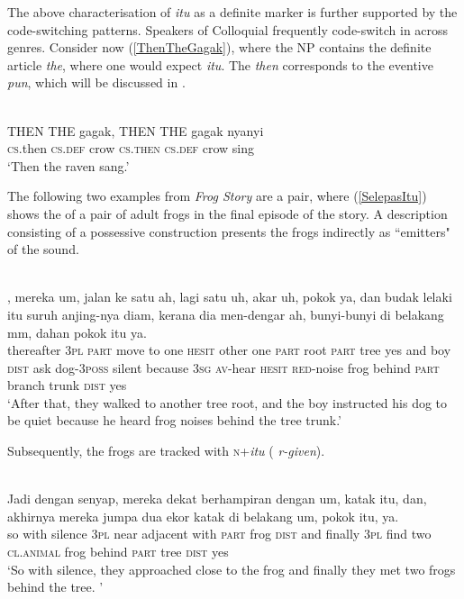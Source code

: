 \documentclass[output=paper
,modfonts
,nonflat]{langsci/langscibook}
\begin{document}
\noindent
The above characterisation of \emph{itu} as a definite marker is further supported by the code-switching patterns. Speakers of Colloquial   frequently code-switch in  across genres. Consider now (\ref{ThenTheGagak}), where the NP contains the  definite article \emph{the}, where one would expect \emph{itu}. The  \emph{then} corresponds to the eventive \emph{pun}, which will be discussed in .

\ea\label{ThenTheGagak} 
\\
\gll 	THEN THE    gagak, THEN THE    gagak nyanyi\\
\textsc{cs.}then \textsc{cs.def} crow  \textsc{cs.then} \textsc{cs.def} crow sing\\
\glt `Then the raven sang.'\\
\z

\noindent
The following two examples from \emph{Frog Story} are a pair, where (\ref{SelepasItu}) shows the  of a pair of adult frogs in the final episode of the story. A description consisting of a possessive construction presents the frogs indirectly as ``emitters" of the sound.

\ea\label{SelepasItu} 
\\
, mereka um,       jalan ke   satu ah,   lagi  satu uh,  akar uh,   pokok ya, dan {budak lelaki} itu suruh anjing-nya     diam,  kerana  dia men-dengar ah,    {\ob}bunyi-bunyi     {di belakang} mm,       dahan  pokok itu ya.\\
thereafter   \textsc{3pl}    \textsc{part} move  to   one  \textsc{hesit} other one  \textsc{part} root \textsc{part} tree  yes and boy  \textsc{dist} ask   dog-\textsc{3poss} silent because \textsc{3sg} \textsc{av-}hear    \textsc{hesit} \textsc{red}-noise frog  behind \textsc{part} branch trunk \textsc{dist} yes\\
\glt `After that, they walked to another tree root, and the boy instructed his dog to be quiet because he heard frog noises behind the tree trunk.'
\z

\noindent
Subsequently, the frogs are tracked with \textsc{n}+\emph{itu} ( \emph{r-given}).

\ea\label{JadiDenganSenyap} 
\\
	\gll Jadi dengan senyap, mereka dekat berhampiran dengan um,        {\ob}katak itu{\cb}, dan, akhirnya mereka jumpa dua ekor katak {di belakang} um,       pokok itu, ya.\\
so   with   silence \textsc{3pl}    near  adjacent    with   \textsc{part} frog  \textsc{dist}  and  finally  \textsc{3pl}    find two \textsc{cl.animal} frog  behind     \textsc{part} tree  \textsc{dist}  yes\\
\glt `So with silence, they approached close to the frog and finally they met two frogs behind the tree. '
\z
\end{document}
